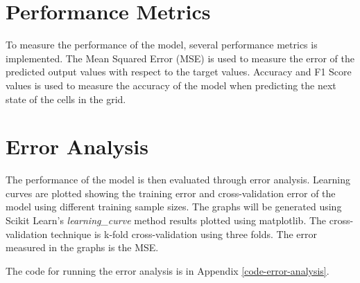 \section{Performance Metrics}
    To measure the performance of the model, several performance metrics is implemented. The Mean Squared Error (MSE) is used to measure the error of the predicted output values with respect to the target values. Accuracy and F1 Score values is used to measure the accuracy of the model when predicting the next state of the cells in the grid.

\section{Error Analysis}
    The performance of the model is then evaluated through error analysis. Learning curves are plotted showing the training error and cross-validation error of the model using different training sample sizes. The graphs will be generated using Scikit Learn's \textit{learning\_curve} method results plotted using matplotlib. The cross-validation technique is k-fold cross-validation using three folds. The error measured in the graphs is the MSE.

    The code for running the error analysis is in Appendix \ref{code-error-analysis}.
